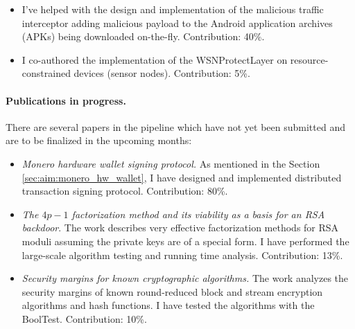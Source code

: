 \documentclass[
  digital, %
  twoside, %
  table,   %
  lof,     %
  lot,     %
]{fithesis3}
\newcounter{ph4_show_guides}
\theoremstyle{definition}
\theoremstyle{remark}
\begin{document}
\begin{itemize}
	\item {}
	I've helped with the design and implementation of the malicious traffic interceptor adding malicious payload to the Android application archives (APKs) being downloaded on-the-fly. Contribution: 40\%.
	
	\item {}
	I co-authored the implementation of the WSNProtectLayer on resource-constrained devices (sensor nodes). Contribution: 5\%.
\end{itemize}

\paragraph{Publications in progress.} There are several papers in the pipeline which have not yet been submitted and are to be finalized in the upcoming months:

\begin{itemize}
	\item \emph{Monero hardware wallet signing protocol.} As mentioned in the Section \ref{sec:aim:monero_hw_wallet}, I have designed and implemented distributed transaction signing protocol. Contribution: 80\%.
	
	\item \emph{The $4p-1$ factorization method and its viability as a basis for an RSA backdoor}. The work describes very effective factorization methods for RSA moduli assuming the private keys are of a special form. I have performed the large-scale algorithm testing and running time analysis. Contribution: 13\%.
	
	\item \emph{Security margins for known cryptographic algorithms.} The work analyzes the security margins of known round-reduced block and stream encryption algorithms and hash functions. I have tested the algorithms with the BoolTest. Contribution: 10\%.	
\end{itemize}
\end{document}
